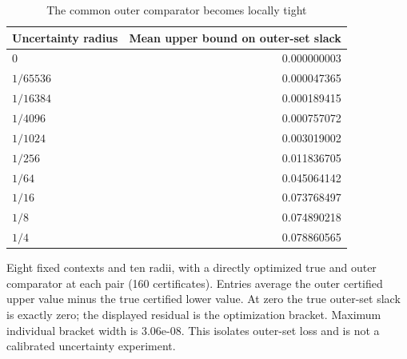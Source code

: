 \begin{table}[htbp]
\centering\small
\caption{The common outer comparator becomes locally tight}\label{tab:radius}
\begin{tabular}{lr}
\toprule
Uncertainty radius & Mean upper bound on outer-set slack \\ \midrule
$0$ & 0.000000003 \\
$1/65536$ & 0.000047365 \\
$1/16384$ & 0.000189415 \\
$1/4096$ & 0.000757072 \\
$1/1024$ & 0.003019002 \\
$1/256$ & 0.011836705 \\
$1/64$ & 0.045064142 \\
$1/16$ & 0.073768497 \\
$1/8$ & 0.074890218 \\
$1/4$ & 0.078860565 \\
\bottomrule
\end{tabular}
\par\smallskip
\begin{minipage}{.98\textwidth}\footnotesize Eight fixed contexts and ten radii, with a directly optimized true and outer comparator at each pair (160 certificates). Entries average the outer certified upper value minus the true certified lower value. At zero the true outer-set slack is exactly zero; the displayed residual is the optimization bracket. Maximum individual bracket width is 3.06e-08. This isolates outer-set loss and is not a calibrated uncertainty experiment.\end{minipage}
\end{table}
